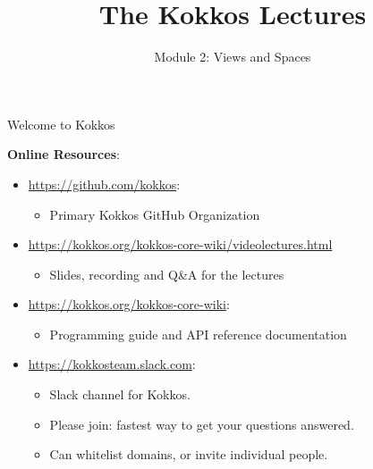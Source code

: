 
\def\sandid{SAND2020-7475 PE}

\title{The Kokkos Lectures}

\author{Module 2: Views and Spaces}




\shortfalse
\mediumtrue
\fulltrue
\notoverviewtrue



% 

\begin{frame}
	\titlepage
\end{frame}

\begin{frame}{Welcome to Kokkos}

\textbf{Online Resources}:

\begin{itemize}
        \item \url{https://github.com/kokkos}:
                \begin{itemize}
                        \item Primary Kokkos GitHub Organization
                \end{itemize}
        \item \url{https://kokkos.org/kokkos-core-wiki/videolectures.html}
                \begin{itemize}
			\item{Slides, recording and Q\&A for the lectures}
                \end{itemize}
        \item \url{https://kokkos.org/kokkos-core-wiki}:
                \begin{itemize}
                        \item Programming guide and API reference documentation
                \end{itemize}
        \item \url{https://kokkosteam.slack.com}:
                \begin{itemize}
                        \item Slack channel for Kokkos.
                        \item Please join: fastest way to get your questions answered.
                        \item Can whitelist domains, or invite individual people.
                \end{itemize}
\end{itemize}

\end{frame}


